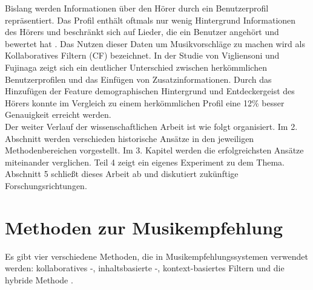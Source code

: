 \documentclass[twosided,a4,10pt]{article}
\begin{document}
\begin{multicols}{2}
Bislang werden Informationen über den Hörer durch ein Benutzerprofil repräsentiert. Das Profil enthält oftmals nur wenig Hintergrund Informationen des Hörers und beschränkt sich auf Lieder, die ein Benutzer angehört und bewertet hat \cite{oord}. Das Nutzen dieser Daten um Musikvorschläge zu machen wird als Kollaboratives Filtern (CF) bezeichnet. In der Studie von Vigliensoni und Fujinaga \cite{vigliensoni} zeigt sich ein deutlicher Unterschied zwischen herkömmlichen Benutzerprofilen und das Einfügen von Zusatzinformationen. Durch das Hinzufügen der Feature demographischen Hintergrund und Entdeckergeist des Hörers konnte im Vergleich zu einem herkömmlichen Profil eine 12\% besser Genauigkeit erreicht werden.\newline\\
Der weiter Verlauf der wissenschaftlichen Arbeit ist wie folgt organisiert. Im 2. Abschnitt werden verschieden historische Ansätze in den jeweiligen Methodenbereichen vorgestellt. Im 3. Kapitel werden die erfolgreichsten Ansätze miteinander verglichen. Teil 4 zeigt ein eigenes Experiment zu dem Thema. Abschnitt 5 schließt dieses Arbeit ab und diskutiert zukünftige Forschungsrichtungen.

\section{Methoden zur Musikempfehlung}
Es gibt vier verschiedene Methoden, die in Musikempfehlungssystemen verwendet werden: kollaboratives -, inhaltsbasierte -, kontext-basiertes Filtern und die hybride Methode \cite{kaitila}.

\end{multicols}
\end{document}
